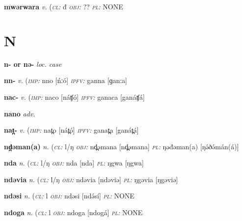 {\newentry
\headword\textbf{mwərwara}  
\ipa{[mwəɾwaɾa]}
\synpos\textit{v.} 
\class(\textit{\textsc{cl:}} {đ}
\object\textit{\textsc{obj:}} ??
\plural\textit{\textsc{pl:}} NONE

\section*{N}\label{N}

\newentry
\headword\textbf{n- or nə-}  
\synpos\textit{loc. case} 

\newentry
\headword\textbf{nn-}  
\ipa{[nː-]}
\synpos\textit{v.} 
\imperative(\textit {\textsc{imp:}} nno [ńːó]
\imperfective\textit{\textsc{ipfv:}} ganna [ɡan:a] 

\newentry
\headword\textbf{nac-}  
\ipa{[náʧ-]}
\synpos\textit{v.} 
\imperative(\textit {\textsc{imp:}} naco [náʧó]
\imperfective\textit{\textsc{ipfv:}} ganaca [ganáʧá] 

\newentry
\headword\textbf{nano}  
\ipa{[nano]}
\synpos\textit{adv.} 

\newentry
\headword\textbf{nat̪-}  
\ipa{[nát̪-]}
\synpos\textit{v.} 
\imperative(\textit {\textsc{imp:}} nat̪o [nát̪ó]
\imperfective\textit{\textsc{ipfv:}} ganat̪a [ganát̪á] 

\newentry
\headword\textbf{nd̪əman(a)}  
\ipa{[nd̪əman(a)]} %
\synpos\textit{n.} 
\class(\textit{\textsc{cl:}} {l/ŋ}
\object\textit{\textsc{obj:}} nd̪əmana [nd̪əmana] %
\plural\textit{\textsc{pl:}} ŋəđəman(a) [ŋə́ðə́mán(á)] 

\newentry
\headword\textbf{nda}  
\ipa{[nda]}
\synpos\textit{n.} 
\class(\textit{\textsc{cl:}} {l/ŋ}
\object\textit{\textsc{obj:}} nda [nda]
\plural\textit{\textsc{pl:}} ŋgwa [ŋgwa]

\newentry
\headword\textbf{ndəvia}  
\ipa{[ndəviə]}
\synpos\textit{n.} 
\class(\textit{\textsc{cl:}} {l/ŋ}
\object\textit{\textsc{obj:}} ndəvia [ndəviə]
\plural\textit{\textsc{pl:}} ŋgəvia [ŋgəviə]


\newentry
\headword\textbf{ndəsi}  
\ipa{[ndə́sí]}
\synpos\textit{n.} 
\class(\textit{\textsc{cl:}} {l}
\object\textit{\textsc{obj:}} ndəsi [ndə́sí]
\plural\textit{\textsc{pl:}} NONE


\newentry
\headword\textbf{ndoga}  
\ipa{[ndogá]}
\synpos\textit{n.} 
\class(\textit{\textsc{cl:}} {l}
\object\textit{\textsc{obj:}} ndoga [ndogá]
\plural\textit{\textsc{pl:}} NONE

}
